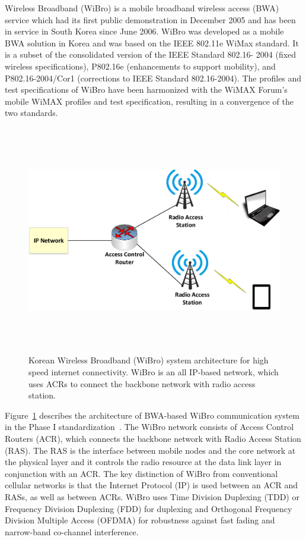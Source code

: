 Wireless Broadband (WiBro) is a mobile broadband wireless access (BWA) service which had its first public demonstration in December 2005 and has been in service in South Korea since June 2006. WiBro was developed as a mobile BWA solution in Korea and was based on the IEEE 802.11e WiMax standard. It is a subset of the consolidated version of the IEEE Standard 802.16-
2004 (fixed wireless specifications), P802.16e (enhancements to support mobility), and P802.16-2004/Cor1 (corrections to IEEE Standard 802.16-2004). The profiles and test specifications of WiBro have been harmonized with the WiMAX Forum's mobile WiMAX profiles and test specification, resulting in a convergence of the two standards.


\begin{figure}[!ht]
\centering
\includegraphics[width=\textwidth,height=10cm,keepaspectratio]{images/Gill/5G/wibro.eps} 
\caption{Korean Wireless Broadband (WiBro) system architecture for high speed internet connectivity. WiBro is an all IP-based network, which uses ACRs to connect the backbone network with radio access station.}
\label{wibro}
\end{figure}

Figure~\ref{wibro} describes the architecture of BWA-based WiBro communication system in the Phase I standardization~\cite{wibro}. The WiBro network consists of Access Control Routers (ACR), which connects the backbone network with Radio Access Station (RAS). The RAS is the interface between mobile nodes and the core network at the physical layer and it controls the radio resource at the data link layer in conjunction with an ACR. The key distinction of WiBro from conventional cellular networks is that the Internet Protocol (IP) is used between an ACR and RASs, as well as between ACRs. WiBro uses Time Division Duplexing (TDD) or Frequency Division Duplexing (FDD) for duplexing and Orthogonal Frequency Division Multiple Access (OFDMA) for robustness against fast fading and narrow-band co-channel interference.


